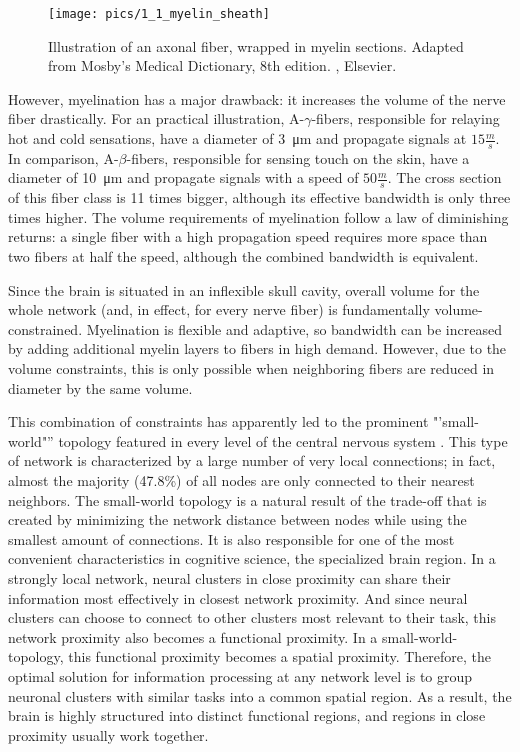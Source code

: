 \begin{figure}[h]
\begin{center}
\vspace{7mm}
\texttt{[image: pics/1\_1\_myelin\_sheath]}
\caption{\label{1.1.neuron.illustrated} Illustration of an axonal fiber, wrapped in myelin sections. Adapted from Mosby's Medical Dictionary, 8th edition. , Elsevier.}
\end{center}
\end{figure}

However, myelination has a major drawback: it increases the volume of the nerve fiber drastically.
For an practical illustration, A-$\gamma$-fibers, responsible for relaying hot and cold sensations, have a diameter of \SI{3}{\um} and propagate signals at $15\frac{m}{s}$.
In comparison, A-$\beta$-fibers, responsible for sensing touch on the skin, have a diameter of \SI{10}{\um} and propagate signals with a speed of $50\frac{m}{s}$.
The cross section of this fiber class is 11 times bigger, although its effective bandwidth is only three times higher.
The volume requirements of myelination follow a law of diminishing returns: a single fiber with a high propagation speed requires more space than two fibers at half the speed, although the combined bandwidth is equivalent.

Since the brain is situated in an inflexible skull cavity, overall volume for the whole network (and, in effect, for every nerve fiber) is fundamentally volume-constrained.
Myelination is flexible and adaptive, so bandwidth can be increased by adding additional myelin layers to fibers in high demand.
However, due to the volume constraints, this is only possible when neighboring fibers are reduced in diameter by the same volume.

This combination of constraints has apparently led to the prominent "'small-world"'' topology featured in every level of the central nervous system \cite{1.1.smallWorld}.
This type of network is characterized by a large number of very local connections; in fact, almost the majority (47.8\%) of all nodes are only connected to their nearest neighbors.
The small-world topology is a natural result of the trade-off that is created by minimizing the network distance between nodes while using the smallest amount of connections.
It is also responsible for one of the most convenient characteristics in cognitive science, the specialized brain region.
In a strongly local network, neural clusters in close proximity can share their information most effectively in closest network proximity.
And since neural clusters can choose to connect to other clusters most relevant to their task, this network proximity also becomes a functional proximity.
In a small-world-topology, this functional proximity becomes a spatial proximity.
Therefore, the optimal solution for information processing at any network level is to group neuronal clusters with similar tasks into a common spatial region.
As a result, the brain is highly structured into distinct functional regions, and regions in close proximity usually work together.

